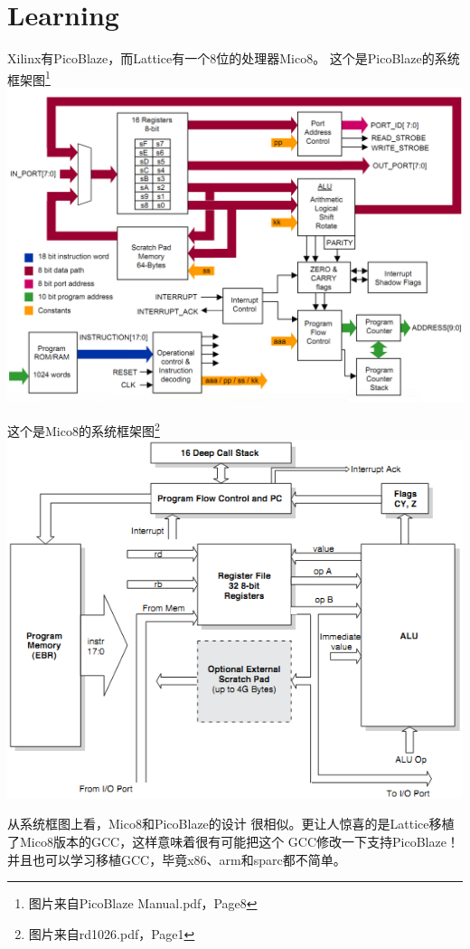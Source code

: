\chapter{Learning}
Xilinx有PicoBlaze，而Lattice有一个8位的处理器Mico8。
这个是PicoBlaze的系统框架图\footnote{图片来自PicoBlaze Manual.pdf，Page8} \\
\includegraphics[width=\textwidth]{images/pb8arch}

这个是Mico8的系统框架图\footnote{图片来自rd1026.pdf，Page1} \\
\includegraphics[width=\textwidth]{images/lm8arch}

从系统框图上看，Mico8和PicoBlaze的设计
很相似。更让人惊喜的是Lattice移植了Mico8版本的GCC，这样意味着很有可能把这个
GCC修改一下支持PicoBlaze！并且也可以学习移植GCC，毕竟x86、arm和sparc都不简单。

